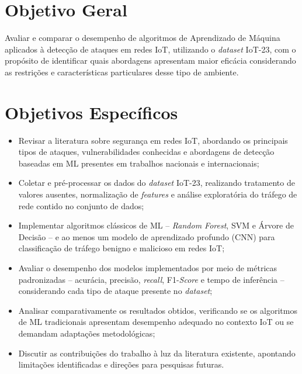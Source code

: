 \section{Objetivo Geral}\label{sec:obj_geral}

Avaliar e comparar o desempenho de algoritmos de Aprendizado de Máquina aplicados à detecção de ataques em redes IoT, utilizando o \textit{dataset} IoT-23, com o propósito de identificar quais abordagens apresentam maior eficácia considerando as restrições e características particulares desse tipo de ambiente.

\section{Objetivos Específicos}\label{sec:obj_espec}

\begin{itemize}[leftmargin=5em]
    \item Revisar a literatura sobre segurança em redes IoT, abordando os principais tipos de ataques, vulnerabilidades conhecidas e abordagens de detecção baseadas em ML presentes em trabalhos nacionais e internacionais;
    \item Coletar e pré-processar os dados do \textit{dataset} IoT-23, realizando tratamento de valores ausentes, normalização de \textit{features} e análise exploratória do tráfego de rede contido no conjunto de dados;
    \item Implementar algoritmos clássicos de ML -- \textit{Random Forest}, SVM e Árvore de Decisão -- e ao menos um modelo de aprendizado profundo (CNN) para classificação de tráfego benigno e malicioso em redes IoT;
    \item Avaliar o desempenho dos modelos implementados por meio de métricas padronizadas -- acurácia, precisão, \textit{recall}, F1-\textit{Score} e tempo de inferência -- considerando cada tipo de ataque presente no \textit{dataset};
    \item Analisar comparativamente os resultados obtidos, verificando se os algoritmos de ML tradicionais apresentam desempenho adequado no contexto IoT ou se demandam adaptações metodológicas;
    \item Discutir as contribuições do trabalho à luz da literatura existente, apontando limitações identificadas e direções para pesquisas futuras.
\end{itemize}